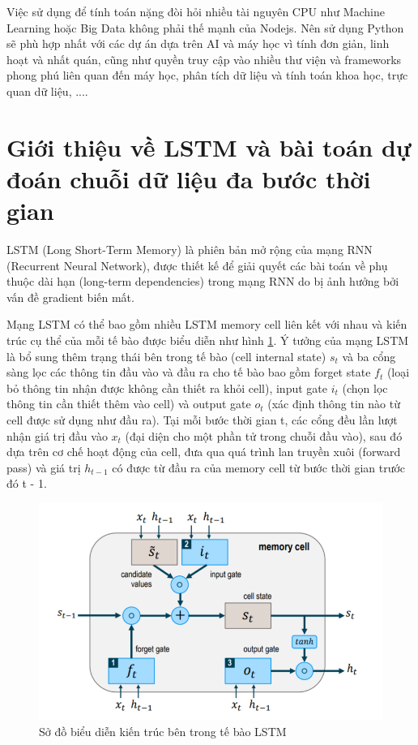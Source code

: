 Việc sử dụng để tính toán nặng đòi hỏi nhiều tài nguyên CPU như Machine Learning hoặc Big Data không phải thế mạnh của Nodejs. Nên sử dụng Python sẽ phù hợp nhất với các dự án dựa trên AI và máy học vì tính đơn giản, linh hoạt và nhất quán, cũng như quyền truy cập vào nhiều thư viện và frameworks phong phú liên quan đến máy học, phân tích dữ liệu và tính toán khoa học, trực quan dữ liệu, ....

\section{Giới thiệu về LSTM và bài toán dự đoán chuỗi dữ liệu đa bước thời gian}
LSTM (Long Short-Term Memory) là phiên bản mở rộng của mạng RNN (Recurrent Neural Network), được thiết kế để giải quyết các bài toán về phụ thuộc dài hạn (long-term dependencies) trong mạng RNN do bị ảnh hưởng bởi vấn đề gradient biến mất.

Mạng LSTM có thể bao gồm nhiều LSTM memory cell liên kết với nhau và kiến trúc cụ thể của mỗi tế bào được biểu diễn như hình \ref{tab.lstm_cell}. Ý tưởng của mạng LSTM là bổ sung thêm trạng thái bên trong tế bào (cell internal state) $s_t$ và ba cổng sàng lọc các thông tin đầu vào và đầu ra cho tế bào bao gồm forget state $f_t$ (loại bỏ thông tin nhận được không cần thiết ra khỏi cell), input gate $i_t$ (chọn lọc thông tin cần thiết thêm vào cell) và output gate $o_t$ (xác định thông tin nào từ cell được sử dụng như đầu ra). Tại mỗi bước thời gian t, các cổng đều lần lượt nhận giá trị đầu vào $x_t$ (đại diện cho một phần tử trong chuỗi đầu vào), sau đó dựa trên cơ chế hoạt động của cell, đưa qua quá trình lan truyền xuôi (forward pass) và giá trị $h_{t-1}$ có được từ đầu ra của memory cell từ bước thời gian trước đó t - 1.

\begin{figure}[H]
    \includegraphics[width=\textwidth]{images/Khanh/Python/LSTM_cell_structure.PNG}
    \caption{Sở đồ biểu diễn kiến trúc bên trong tế bào LSTM \cite{lstmintroduction}}
    \label{tab.lstm_cell}
\end{figure}

